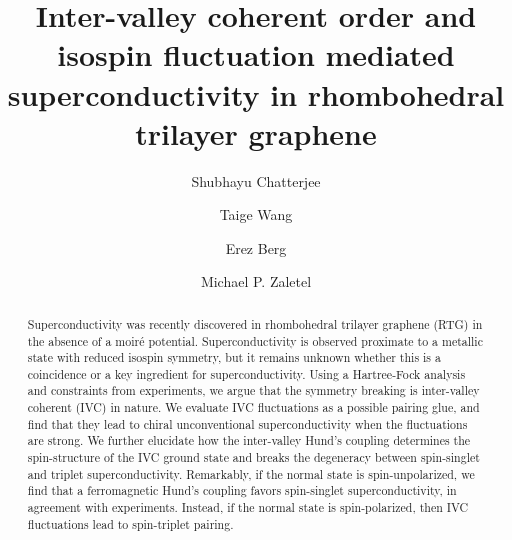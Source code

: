 \documentclass[aps,pra,twocolumn,superscriptaddress,10pt,article,nofootinbib,showpacs,longbibliography]{revtex4-1}
\begin{document}
\title{Inter-valley coherent order and isospin fluctuation mediated superconductivity in rhombohedral trilayer graphene}
\author{Shubhayu Chatterjee}
\author{Taige Wang}
\author{Erez Berg}
\author{Michael P. Zaletel}

\begin{abstract}
Superconductivity was recently discovered in rhombohedral trilayer graphene (RTG) in the absence of a moir\'e potential.
Superconductivity is observed proximate to a metallic state with reduced isospin symmetry, but it remains unknown whether this is a coincidence or a key ingredient for superconductivity. 
Using a Hartree-Fock analysis and constraints from experiments, we argue that the symmetry breaking is inter-valley coherent (IVC) in nature.
We evaluate IVC fluctuations as a possible pairing glue, and find that they  lead to chiral unconventional superconductivity when the fluctuations are strong. 
We further elucidate how the inter-valley Hund's coupling determines the spin-structure of the IVC ground state and breaks the degeneracy between spin-singlet and triplet superconductivity. 
Remarkably, if the normal state is spin-unpolarized, we find that a ferromagnetic Hund's coupling favors spin-singlet superconductivity, in agreement with experiments.
Instead, if the normal state is spin-polarized, then IVC fluctuations lead to spin-triplet pairing.
\end{abstract}

\maketitle
\end{document}
